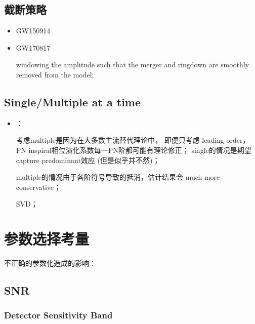 \documentclass[CJK]{paper}  %
\begin{document}
\subsection{截断策略}
\begin{itemize}
	\item[1. ] GW150914
	\item[2. ] GW170817 \cite{test_GR_GW170817}
		\par windowing the amplitude such that the merger and ringdown are smoothly removed from the model;
\end{itemize}


\subsection{Single/Multiple at a time}
\begin{itemize}
	\item[1. ]\par \cite{test_GR_GW150914}：
		\par 考虑multiple是因为在大多数主流替代理论中，
		即便只考虑 leading order，PN inspiral相位演化系数每一PN阶都可能有理论修正；
		single的情况是期望capture predominant效应 (但是似乎并不然\cite{false_parametrization})；
		\par multiple的情况由于各阶符号导致的抵消，估计结果会 much more conservative；
		\par SVD\cite{PN_coeffcients_SVD}；
\end{itemize}




\newpage
\section{参数选择考量}

\par 不正确的参数化造成的影响：\cite{false_parametrization}

\subsection{SNR}

\subsubsection{Detector Sensitivity Band}
\end{document}
